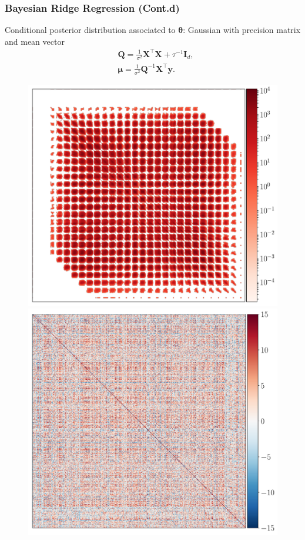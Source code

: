 \documentclass[aspectratio=169]{beamer}
\newcommand{\B}[1]{\mathbf{#1}} %
\newcommand{\Bs}[1]{\boldsymbol{#1}} %
\begin{document}
\begin{frame}
\frametitle{Bayesian Ridge Regression (Cont.d)}
Conditional posterior distribution associated to $\Bs{\theta}$: Gaussian with precision matrix and mean vector
\[
  \begin{aligned}
    &\B{Q} = \frac{1}{\sigma^{2}}\B{X}^{\top}\B{X} + \tau^{-1}\B{I}_d, \\
    &\Bs{\mu} = \frac{1}{\sigma^{2}} \B{Q}^{-1}\B{X}^{\top}\B{y}. 
  \end{aligned} 
\]
\begin{figure}
    \centering
    \mbox{{\includegraphics[scale=0.15]{src/images/MNIST_AA.pdf}}}
    \mbox{{\includegraphics[scale=0.15]{src/images/Armstrong_AA.pdf}}}

\end{figure}
\end{frame}
\end{document}
